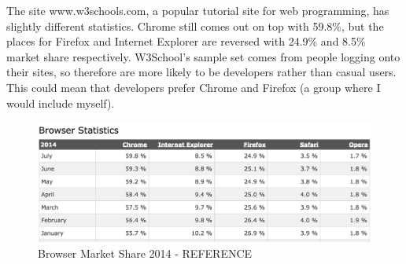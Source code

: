\documentclass[a4paper,11pt,twoside]{article}
\begin{document}
The site www.w3schools.com, a popular tutorial site for web programming, has slightly different statistics. Chrome still comes out on top with 59.8\%, but the places for Firefox and Internet Explorer are reversed with 24.9\% and 8.5\% market share respectively. W3School's sample set comes from people logging onto their sites, so therefore are more likely to be developers rather than casual users. This could mean that developers prefer Chrome and Firefox (a group where I would include myself).

\begin{figure}[ht!]
\centering
\includegraphics[width=170mm]{graphics/webStats_01b.png}
\caption{Browser Market Share 2014 - REFERENCE}
\label{fig:UIdesign1}
\end{figure}
\end{document}
